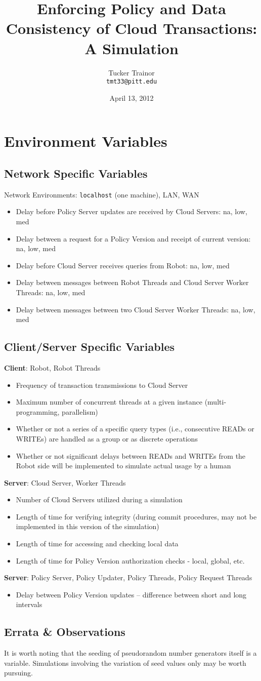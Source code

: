 \documentclass[11pt]{article}
\title{Enforcing Policy and Data Consistency of Cloud Transactions: A Simulation}
\author{Tucker Trainor\\\texttt{tmt33@pitt.edu}}
\date{April 13, 2012} %
\begin{document}
\maketitle
\section{Environment Variables}
\subsection{Network Specific Variables}
Network Environments: \texttt{localhost} (one machine), LAN, WAN
\begin{itemize}
\item{}Delay before Policy Server updates are received by Cloud Servers: na, low, med
\item{}Delay between a request for a Policy Version and receipt of current version: na, low, med
\item{}Delay before Cloud Server receives queries from Robot: na, low, med
\item{}Delay between messages between Robot Threads and Cloud Server Worker Threads: na, low, med
\item{}Delay between messages between two Cloud Server Worker Threads: na, low, med
\end{itemize}
\subsection{Client/Server Specific Variables}
\textbf{Client}: Robot, Robot Threads
\begin{itemize}
\item{}Frequency of transaction transmissions to Cloud Server
\item{}Maximum number of concurrent threads at a given instance (multi-programming, parallelism)
\item{}Whether or not a series of a specific query types (i.e., consecutive READs or WRITEs) are handled as a group or as discrete operations
\item{}Whether or not significant delays between READs and WRITEs from the Robot side will be implemented to simulate actual usage by a human
\end{itemize}
\textbf{Server}: Cloud Server, Worker Threads
\begin{itemize}
\item{}Number of Cloud Servers utilized during a simulation
\item{}Length of time for verifying integrity (during commit procedures, may not be implemented in this version of the simulation)
\item{}Length of time for accessing and checking local data
\item{}Length of time for Policy Version authorization checks - local, global, etc.
\end{itemize}
\textbf{Server}: Policy Server, Policy Updater, Policy Threads, Policy Request Threads
\begin{itemize}
\item{}Delay between Policy Version updates -- difference between short and long intervals
\end{itemize}
\subsection{Errata \& Observations}
It is worth noting that the seeding of pseudorandom number generators itself is a variable. Simulations involving the variation of seed values only may be worth pursuing.
\end{document}
